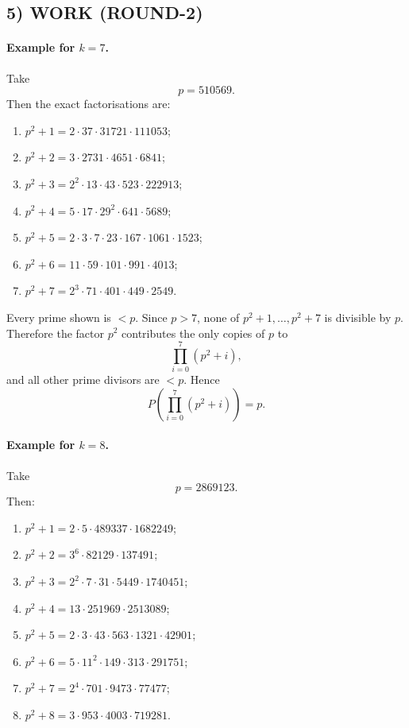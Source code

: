 \subsection*{5) WORK (ROUND-2)}

\paragraph{Example for $k=7$.}
Take
\[
p=510569.
\]
Then the exact factorisations are:

\begin{enumerate}
\item $p^2+1=2\cdot 37\cdot 31721\cdot 111053$;
\item $p^2+2=3\cdot 2731\cdot 4651\cdot 6841$;
\item $p^2+3=2^2\cdot 13\cdot 43\cdot 523\cdot 222913$;
\item $p^2+4=5\cdot 17\cdot 29^2\cdot 641\cdot 5689$;
\item $p^2+5=2\cdot 3\cdot 7\cdot 23\cdot 167\cdot 1061\cdot 1523$;
\item $p^2+6=11\cdot 59\cdot 101\cdot 991\cdot 4013$;
\item $p^2+7=2^3\cdot 71\cdot 401\cdot 449\cdot 2549$.
\end{enumerate}

Every prime shown is $<p$. Since $p>7$, none of $p^2+1,\dots,p^2+7$ is divisible by $p$. Therefore the factor $p^2$ contributes the only copies of $p$ to
\[
\prod_{i=0}^{7}(p^2+i),
\]
and all other prime divisors are $<p$. Hence
\[
P\!\left(\prod_{i=0}^{7}(p^2+i)\right)=p.
\]

\paragraph{Example for $k=8$.}
Take
\[
p=2869123.
\]
Then:

\begin{enumerate}
\item $p^2+1=2\cdot 5\cdot 489337\cdot 1682249$;
\item $p^2+2=3^6\cdot 82129\cdot 137491$;
\item $p^2+3=2^2\cdot 7\cdot 31\cdot 5449\cdot 1740451$;
\item $p^2+4=13\cdot 251969\cdot 2513089$;
\item $p^2+5=2\cdot 3\cdot 43\cdot 563\cdot 1321\cdot 42901$;
\item $p^2+6=5\cdot 11^2\cdot 149\cdot 313\cdot 291751$;
\item $p^2+7=2^4\cdot 701\cdot 9473\cdot 77477$;
\item $p^2+8=3\cdot 953\cdot 4003\cdot 719281$.
\end{enumerate}

